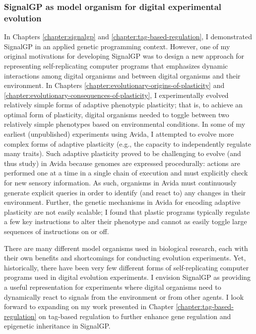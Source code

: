 \subsubsection{SignalGP as model organism for digital experimental evolution}

In Chapters \ref{chapter:signalgp} and \ref{chapter:tag-based-regulation}, I demonstrated SignalGP in an applied genetic programming context. 
However, one of my original motivations for developing SignalGP was to design a new approach for representing self-replicating computer programs that emphasizes dynamic interactions among digital organisms and between digital organisms and their environment.
In Chapters \ref{chapter:evolutionary-origins-of-plasticity} and \ref{chapter:evolutionary-consequences-of-plasticity}, I experimentally evolved relatively simple forms of adaptive phenotypic plasticity; that is, to achieve an optimal form of plasticity, digital organisms needed to toggle between two relatively simple phenotypes based on environmental conditions. 
In some of my earliest (unpublished) experiments using Avida, I attempted to evolve more complex forms of adaptive plasticity (e.g., the capacity to independently regulate many traits). 
Such adaptive plasticity proved to be challenging to evolve (and thus study) in Avida because genomes are expressed procedurally: actions are performed one at a time in a single chain of execution and must explicitly check for new sensory information.
As such, organisms in Avida must continuously generate explicit queries in order to identify (and react to) any changes in their environment.
Further, the genetic mechanisms in Avida for encoding adaptive plasticity are not easily scalable; I found that plastic programs typically regulate a few key instructions to alter their phenotype and cannot as easily toggle large sequences of instructions on or off.

There are many different model organisms used in biological research, each with their own benefits and shortcomings for conducting evolution experiments. 
Yet, historically, there have been very few different forms of self-replicating computer programs used in digital evolution experiments. 
I envision SignalGP as providing a useful representation for experiments where digital organisms need to dynamically react to signals from the environment or from other agents. 
I look forward to expanding on my work presented in Chapter \ref{chapter:tag-based-regulation} on tag-based regulation to further enhance gene regulation and epigenetic inheritance in SignalGP.   

